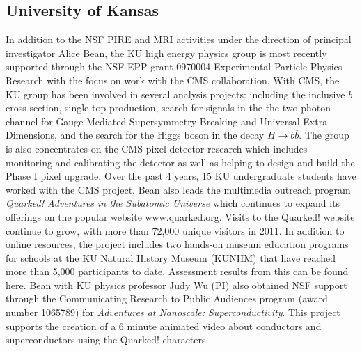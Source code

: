 
\subsection{University of Kansas}

In addition to the NSF PIRE and MRI activities under the direction of
principal investigator Alice Bean, the KU high energy physics group is
most recently supported through the NSF EPP grant 0970004
Experimental Particle Physics Research with the focus on work with the
CMS collaboration.  With CMS, the KU group has been involved in
several analysis projects: including the inclusive $b$ cross
section\cite{bcross}, single top production\cite{singletop}, search
for signals in the the two photon channel for Gauge-Mediated
Supersymmetry-Breaking and Universal Extra Dimensions\cite{dmsearch},
and the search for the Higgs boson in the decay $H\rightarrow
b\overline{b}$\cite{higgsbb}.  The group is also concentrates on the
CMS pixel detector research which includes monitoring and calibrating
the detector as well as helping to design and build the Phase I pixel
upgrade.  Over the past 4 years, 15 KU undergraduate students have
worked with the CMS project.  Bean also leads the multimedia outreach
program {\it Quarked!  Adventures in the Subatomic Universe} which
continues to expand its offerings on the popular website
www.quarked.org.  Visits to the Quarked! website continue to grow,
with more than 72,000 unique visitors in 2011. In addition to online
resources, the project includes two hands-on museum education programs
for schools at the KU Natural History Museum (KUNHM) that have reached
more than 5,000 participants to date.  Assessment results from this
can be found here\cite{quarked}.  Bean with KU physics professor Judy
Wu (PI) also obtained NSF support through the Communicating Research
to Public Audiences program (award number 1065789) for {\it Adventures
  at Nanoscale: Superconductivity}. This project supports the creation
of a 6 minute animated video about conductors and superconductors
using the Quarked! characters.



